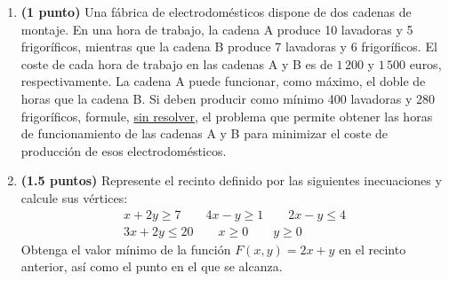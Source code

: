 
\begin{enumerate}[label=\alph*)]
  \item \textbf{(1 punto)} Una fábrica de electrodomésticos dispone de dos
  cadenas de montaje. En una hora de trabajo, la cadena A produce 10 lavadoras
  y 5 frigoríficos, mientras que la cadena B produce 7 lavadoras y 6 frigoríficos.
  El coste de cada hora de trabajo en las cadenas A y B es de $1\,200$ y
  $1\,500$ euros, respectivamente. La cadena A puede funcionar, como máximo,
  el doble de horas que la cadena B. Si deben producir como mínimo 400 lavadoras
  y 280 frigoríficos, formule, \underline{sin resolver}, el problema que permite
  obtener las horas de funcionamiento de las cadenas A y B para minimizar el
  coste de producción de esos electrodomésticos.
  \item \textbf{(1.5 puntos)} Represente el recinto definido por las siguientes
  inecuaciones y calcule sus vértices:
  \[
  \begin{gathered}
  x+2y\geq 7\qquad 4x-y\geq 1\qquad 2x-y\leq 4\\
  3x+2y\leq 20\qquad x\geq 0\qquad y\geq 0
  \end{gathered}
  \]
  Obtenga el valor mínimo de la función $F(x,y)=2x+y$ en el recinto anterior,
  así como el punto en el que se alcanza.
\end{enumerate}
